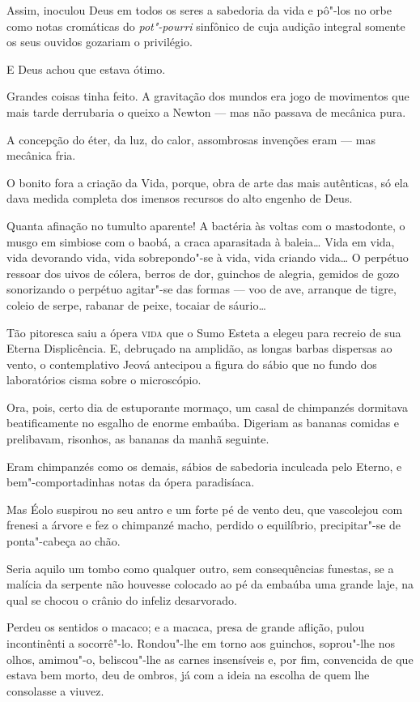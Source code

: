 Assim, inoculou Deus em todos os seres a sabedoria da vida e pô"-los no
orbe como notas cromáticas do \emph{pot"-pourri} sinfônico de cuja
audição integral somente os seus ouvidos gozariam o privilégio.

E Deus achou que estava ótimo.

Grandes coisas tinha feito. A gravitação dos mundos era jogo de
movimentos que mais tarde derrubaria o queixo a Newton --- mas não
passava de mecânica pura.

A concepção do éter, da luz, do calor, assombrosas invenções eram ---
mas mecânica fria.

O bonito fora a criação da Vida, porque, obra de arte das mais
autênticas, só ela dava medida completa dos imensos recursos do alto
engenho de Deus.

Quanta afinação no tumulto aparente! A bactéria às voltas com o
mastodonte, o musgo em simbiose com o baobá, a craca aparasitada à
baleia\ldots{} Vida em vida, vida devorando vida, vida sobrepondo"-se à vida,
vida criando vida\ldots{} O perpétuo ressoar dos uivos de cólera, berros de
dor, guinchos de alegria, gemidos de gozo sonorizando o perpétuo
agitar"-se das formas --- voo de ave, arranque de tigre, coleio de serpe,
rabanar de peixe, tocaiar de sáurio\ldots{}

Tão pitoresca saiu a ópera \textsc{vida} que o Sumo Esteta a elegeu para recreio
de sua Eterna Displicência. E, debruçado na amplidão, as longas barbas
dispersas ao vento, o contemplativo Jeová antecipou a figura do sábio
que no fundo dos laboratórios cisma sobre o microscópio.

Ora, pois, certo dia de estuporante mormaço, um casal de chimpanzés
dormitava beatificamente no esgalho de enorme embaúba. Digeriam as
bananas comidas e prelibavam, risonhos, as bananas da manhã seguinte.

Eram chimpanzés como os demais, sábios de sabedoria inculcada pelo
Eterno, e bem"-comportadinhas notas da ópera paradisíaca.

Mas Éolo suspirou no seu antro e um forte pé de vento deu, que
vascolejou com frenesi a árvore e fez o chimpanzé macho, perdido o
equilíbrio, precipitar"-se de ponta"-cabeça ao chão.

Seria aquilo um tombo como qualquer outro, sem consequências funestas,
se a malícia da serpente não houvesse colocado ao pé da embaúba uma
grande laje, na qual se chocou o crânio do infeliz desarvorado.

Perdeu os sentidos o macaco; e a macaca, presa de grande aflição, pulou
incontinênti a socorrê"-lo. Rondou"-lhe em torno aos guinchos, soprou"-lhe
nos olhos, amimou"-o, beliscou"-lhe as carnes insensíveis e, por fim,
convencida de que estava bem morto, deu de ombros, já com a ideia na
escolha de quem lhe consolasse a viuvez.

